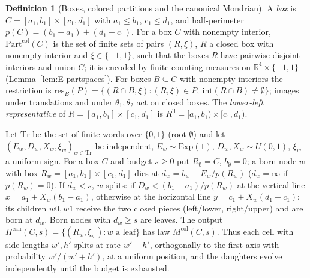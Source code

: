 \documentclass[11pt]{article}
\theoremstyle{plain}
\theoremstyle{definition}
\newtheorem{definition}[theorem]{Definition}
\theoremstyle{remark}
\newcommand{\R}{\mathbb{R}}
\newcommand{\Part}{\mathrm{Part}}
\newcommand{\Mcol}{M^{\mathrm{col}}}
\newcommand{\resB}{\mathrm{res}}
\begin{document}
\begin{definition}[Boxes, colored partitions and the canonical Mondrian]\label{def:mondrian-box}
A \emph{box} is $C=[a_1,b_1]\times[c_1,d_1]$ with $a_1\le b_1$, $c_1\le d_1$, and
half-perimeter $p(C)=(b_1-a_1)+(d_1-c_1)$. For a box $C$ with nonempty interior,
$\Part^{\mathrm{col}}(C)$ is the set of finite sets of pairs $(R,\xi)$, $R$ a
closed box with nonempty interior and $\xi\in\{-1,1\}$, such that the boxes $R$
have pairwise disjoint interiors and union $C$; it is encoded by finite counting
measures on $\R^{4}\times\{-1,1\}$ (Lemma~\ref{lem:E-partspaces}). For boxes
$B\subseteq C$ with nonempty interiors the restriction is
$\resB_B(P)=\{(R\cap B,\xi):(R,\xi)\in P,\ \mathrm{int}(R\cap B)\neq\emptyset\}$;
images under translations and under $\theta_1,\theta_2$ act on closed boxes. The
\emph{lower-left representative} of $R=[a_1,b_1]\times[c_1,d_1]$ is
$R^{\mathrm{ll}}=[a_1,b_1)\times[c_1,d_1)$.

Let $\mathrm{Tr}$ be the set of finite words over $\{0,1\}$ (root $\emptyset$)
and let $(E_w,D_w,X_w,\xi_w)_{w\in\mathrm{Tr}}$ be independent, $E_w\sim\mathrm{Exp}(1)$,
$D_w,X_w\sim U(0,1)$, $\xi_w$ a uniform sign. For a box $C$ and budget $s\ge0$
put $R_\emptyset=C$, $b_\emptyset=0$; a born node $w$ with box
$R_w=[a_1,b_1]\times[c_1,d_1]$ dies at $d_w=b_w+E_w/p(R_w)$ ($d_w=\infty$ if
$p(R_w)=0$). If $d_w<s$, $w$ splits: if $D_w<(b_1-a_1)/p(R_w)$ at the vertical
line $x=a_1+X_w(b_1-a_1)$, otherwise at the horizontal line $y=c_1+X_w(d_1-c_1)$;
its children $w0,w1$ receive the two closed pieces (left/lower, right/upper) and
are born at $d_w$. Born nodes with $d_w\ge s$ are leaves. The output
$\Pi^{\mathrm{can}}(C,s)=\{(R_w,\xi_w):w\text{ a leaf}\}$ has law
$\Mcol(C,s)$. Thus each cell with side lengths $w',h'$ splits at rate $w'+h'$,
orthogonally to the first axis with probability $w'/(w'+h')$, at a uniform
position, and the daughters evolve independently until the budget is exhausted.
\end{definition}
\end{document}
